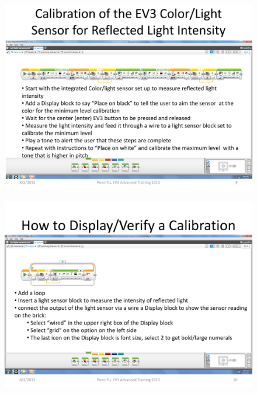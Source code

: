 \documentclass[11pt]{beamer}
\begin{document}
\begin{frame}
\begin{figure}
\includegraphics[scale=0.4]{ev3advanced2015/file-page9}
\end{figure}
\end{frame}

\begin{frame}
\begin{figure}
\includegraphics[scale=0.4]{ev3advanced2015/file-page10}
\end{figure}
\end{frame}
\end{document}
